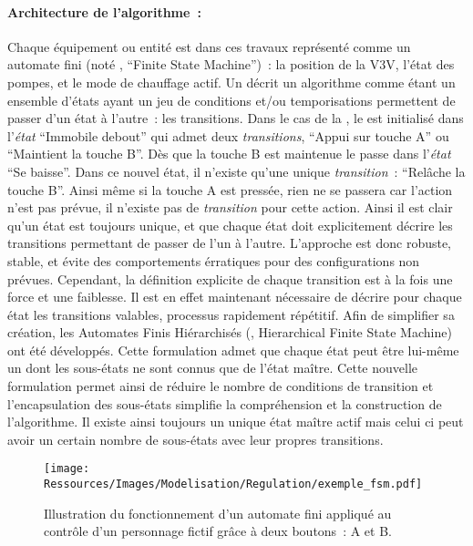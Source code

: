 \paragraph{Architecture de l’algorithme~:} %
\label{par:architecture_de_l_algorithme}
Chaque équipement ou entité est dans ces travaux représenté comme un automate fini (noté ,
\enquote{Finite State Machine})~: la position de la V3V, l’état des
pompes, et le mode de chauffage actif. Un  décrit un algorithme comme étant un
ensemble d’états ayant un jeu de conditions et/ou temporisations permettent de passer d’un
état à l’autre~: les transitions.
Dans le cas de la , le  est initialisé dans l’\textit{état}
\enquote{Immobile debout} qui admet deux \textit{transitions}, \enquote{Appui sur touche A}
ou \enquote{Maintient la touche B}. Dès que la touche B est maintenue le 
passe dans l’\textit{état} \enquote{Se baisse}. Dans ce nouvel état, il n’existe qu’une
unique \textit{transition}~: \enquote{Relâche la touche B}. Ainsi même si la touche A
est pressée, rien ne se passera car l’action n’est pas prévue, il n’existe pas de \textit{transition}
pour cette action. Ainsi il est clair qu’un état est toujours unique, et que chaque état doit
explicitement décrire les transitions permettant de passer de l’un à l’autre.
L’approche est donc robuste, stable, et évite des comportements érratiques pour des configurations
non prévues.
Cependant, la définition explicite de chaque transition est à la fois une force et une faiblesse.
Il est en effet maintenant nécessaire de décrire pour chaque état les transitions
valables, processus rapidement répétitif.
Afin de simplifier sa création, les Automates Finis Hiérarchisés (, Hierarchical
Finite State Machine) ont été développés. Cette formulation admet que chaque état peut
être lui-même un  dont les sous-états ne sont connus que de l’état maître. Cette
nouvelle formulation permet ainsi de réduire le nombre de conditions de transition et
l’encapsulation des sous-états simplifie la compréhension et la construction de
l’algorithme. Il existe ainsi toujours un unique état maître actif mais celui ci peut avoir
un certain nombre de sous-états avec leur propres transitions.

\begin{figure}
    \centering
    \texttt{[image: Ressources/Images/Modelisation/Regulation/exemple\_fsm.pdf]}
    \caption[Illustration du fonctionnement d’un automate fini]
            {Illustration du fonctionnement d’un automate fini appliqué au contrôle
             d’un personnage fictif grâce à deux boutons~: A et B.}
    \label{fig:automate_fini}
\end{figure}

